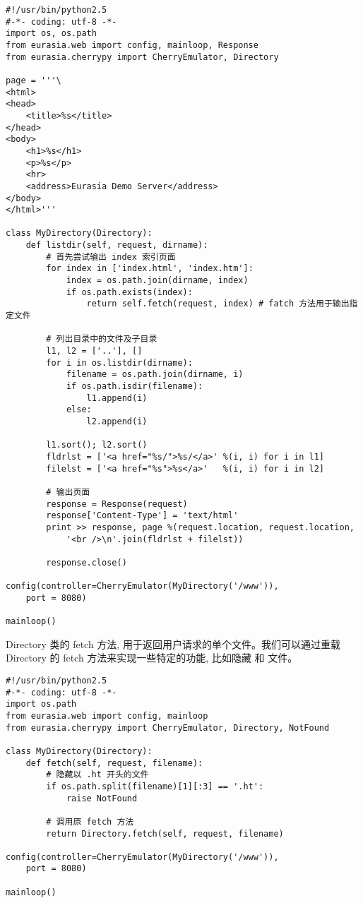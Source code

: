 \documentclass{manual}
\begin{document}
\begin{verbatim}
#!/usr/bin/python2.5
#-*- coding: utf-8 -*-
import os, os.path
from eurasia.web import config, mainloop, Response
from eurasia.cherrypy import CherryEmulator, Directory

page = '''\
<html>
<head>
	<title>%s</title>
</head>
<body>
	<h1>%s</h1>
	<p>%s</p>
	<hr>
	<address>Eurasia Demo Server</address>
</body>
</html>'''

class MyDirectory(Directory):
	def listdir(self, request, dirname):
		# 首先尝试输出 index 索引页面
		for index in ['index.html', 'index.htm']:
			index = os.path.join(dirname, index)
			if os.path.exists(index):
				return self.fetch(request, index) # fatch 方法用于输出指定文件

		# 列出目录中的文件及子目录
		l1, l2 = ['..'], []
		for i in os.listdir(dirname):
			filename = os.path.join(dirname, i)
			if os.path.isdir(filename):
				l1.append(i)
			else:
				l2.append(i)

		l1.sort(); l2.sort()
		fldrlst = ['<a href="%s/">%s/</a>' %(i, i) for i in l1]
		filelst = ['<a href="%s">%s</a>'   %(i, i) for i in l2]

		# 输出页面
		response = Response(request)
		response['Content-Type'] = 'text/html'
		print >> response, page %(request.location, request.location,
			'<br />\n'.join(fldrlst + filelst))

		response.close()

config(controller=CherryEmulator(MyDirectory('/www')),
	port = 8080)

mainloop()
\end{verbatim}

Directory 类的 fetch 方法, 用于返回用户请求的单个文件。我们可以通过重载 Directory 的 fetch 方法来实现一些特定的功能, 比如隐藏  和  文件。

\begin{verbatim}
#!/usr/bin/python2.5
#-*- coding: utf-8 -*-
import os.path
from eurasia.web import config, mainloop
from eurasia.cherrypy import CherryEmulator, Directory, NotFound

class MyDirectory(Directory):
	def fetch(self, request, filename):
		# 隐藏以 .ht 开头的文件
		if os.path.split(filename)[1][:3] == '.ht':
			raise NotFound

		# 调用原 fetch 方法
		return Directory.fetch(self, request, filename)

config(controller=CherryEmulator(MyDirectory('/www')),
	port = 8080)

mainloop()
\end{verbatim}
\end{document}
